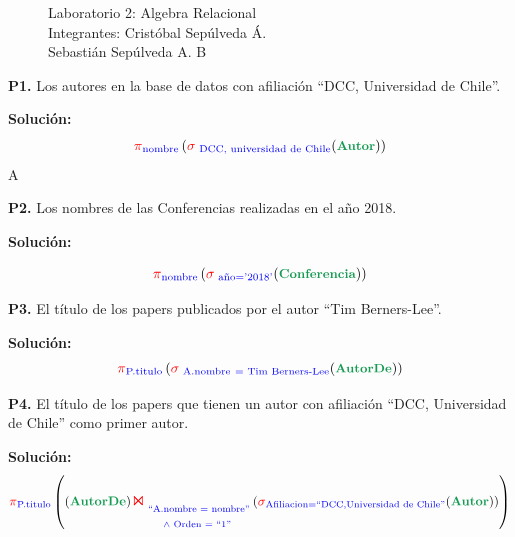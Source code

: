 \documentclass[letterpaper,11pt]{article}
\begin{document}
\pagestyle{style2}
\begin{figure}
\centering
\begin{minipage}[c]{0.8\textwidth}
\centering
\vspace{0.3cm}
{\Large Laboratorio 2: Algebra Relacional}
\vspace{0.3cm}\\
Integrantes: Cristóbal Sepúlveda Á.\\ Sebastián Sepúlveda A.
B
\end{minipage}
\end{figure}

\textbf{P1.} Los autores en la base de datos con afiliación “DCC, Universidad de Chile”.

\textbf{Solución:}
{\large
\begin{equation*}
 \textcolor{red}{\pi}_{\textcolor{blue}{\textrm{nombre}}} \left(\textcolor{red}{\sigma}_{\textcolor{blue}{\textrm{\ DCC, universidad de Chile}}} (\textrm{\textbf{\textcolor{ForestGreen}{\small Autor}}})  \right)
\end{equation*}
}
A

\textbf{P2.} Los nombres de las Conferencias realizadas en el año 2018.

\textbf{Solución:}

{\large
\begin{equation*}
 \textcolor{red}{\pi}_{\textcolor{blue}{\textrm{nombre}}} \left(\textcolor{red}{\sigma}_{\textcolor{blue}{\textrm{\ año='2018'}}} (\textrm{\textbf{\textcolor{ForestGreen}{\small Conferencia}}})  \right)
\end{equation*}
}

\textbf{P3.} El título de los papers publicados por el autor “Tim Berners-Lee”.

\textbf{Solución:}
{\large
\begin{equation*}
 \textcolor{red}{\pi}_{\textcolor{blue}{\textrm{P.titulo}}} \left(\textcolor{red}{\sigma}_{\textcolor{blue}{\textrm{\ A.nombre}\ = \textrm{\ Tim Berners-Lee}}} (\textbf{\textcolor{ForestGreen}{\textrm{\small AutorDe}}})  \right)
\end{equation*}
}

\textbf{P4.} El título de los papers que tienen un autor con afiliación “DCC, Universidad de Chile” como primer autor.

\textbf{Solución:}
{\large
\begin{equation*}
 \textcolor{red}{\pi}_{\textcolor{blue}{\textrm{P.titulo}}} \left( (\textbf{\textcolor{ForestGreen}{AutorDe}})\textcolor{red}{\textup{\Large $\Join$}}_{\textcolor{blue}{\textrm{$\begin{array}{@{\hspace{2pt}}c@{\hspace{2pt}}}
 \textrm{\textcolor{blue}{``A.nombre = nombre''}}\\
 \wedge\ \textrm{\textcolor{blue}{Orden = ``1''} }
 \end{array}$}}}(\textcolor{red}{\sigma}_{\textcolor{blue}{\textrm{Afiliacion=``DCC,Universidad de Chile''}}}(\textbf{\textcolor{ForestGreen}{Autor}}))\right)
\end{equation*}
}
\end{document}
